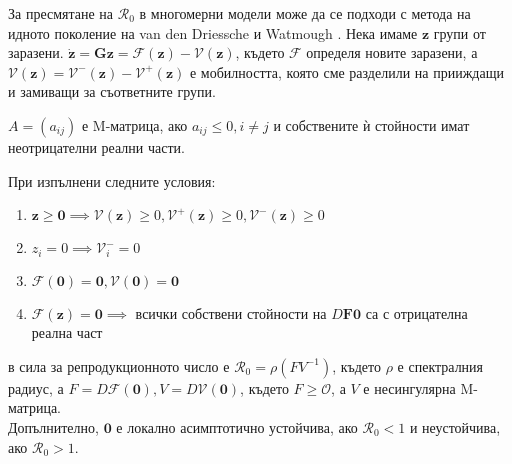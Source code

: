 За пресмятане на $\mathscr{R}_0$ в многомерни модели може да се подходи с метода на идното поколение на van den Driessche и Watmough \cite{Driesche2002}.
Нека имаме $\mathbf{z}$ групи от заразени. $\dot{\mathbf{z}} = \mathbf{G}{\mathbf{z}} = \mathscr{F}(\mathbf{z}) - \mathscr{V}(\mathbf{z})$, където $\mathscr{F}$ определя новите заразени, а $\mathscr{V}(\mathbf{z}) = \mathscr{V}^-(\mathbf{z}) - \mathscr{V}^+(\mathbf{z})$ е мобилността, която сме разделили на прииждащи и замиващи за съответните групи.

\begin{definition}
  $A = (a_{ij})$ е M-матрица, ако $a_{ij} \leq 0, i \neq j$ и собствените ѝ стойности имат неотрицателни реални части.
\end{definition}

\begin{theorem}
  При изпълнени следните условия:
  \begin{enumerate}
    \item $\mathbf{z} \geq \mathbf{0} \implies \mathscr{V}(\mathbf{z}) \geq 0, \mathscr{V}^+(\mathbf{z}) \geq 0, \mathscr{V}^-(\mathbf{z}) \geq 0$
    \item $z_i = 0 \implies \mathscr{V}_{i}^- = 0$
    \item $\mathscr{F}(\mathbf{0}) = \mathbf{0}, \mathscr{V}(\mathbf{0}) = \mathbf{0}$
    \item $\mathscr{F}(\mathbf{z}) = \mathbf{0} \implies$ всички собствени стойности на $D\mathbf{F}{\mathbf{0}}$ са с отрицателна реална част
  \end{enumerate}
  в сила за репродукционното число е $\mathscr{R}_0 = \rho(F V^{-1})$, където $\rho$ е спектралния радиус, а $F = D\mathscr{F}(\mathbf{0}), V = D\mathscr{V}(\mathbf{0})$, където $F \geq \mathscr{O}$, а $V$ е несингулярна M-матрица. \\
  Допълнително, $\mathbf{0}$ е локално асимптотично устойчива, ако $\mathscr{R}_0 < 1$ и неустойчива, ако $\mathscr{R}_0 > 1$.
\end{theorem}

